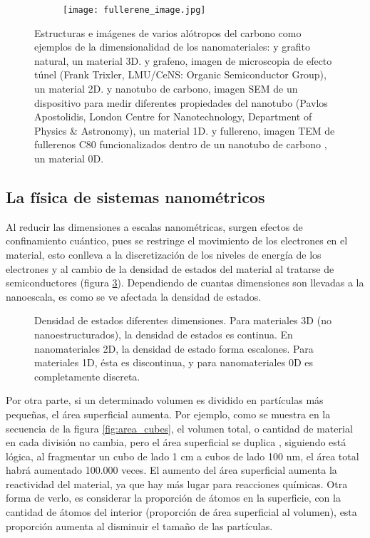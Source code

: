 \begin{figure}
\begin{subfigure}[b]{0.2\textwidth}
		\texttt{[image: fullerene\_image.jpg]}
		\caption{}
		\label{fig:fullerene_image}
	\end{subfigure}
	\caption[Alótropos del carbono mostrando las diferentes dimensionalidades de los nanomateriales]{Estructuras e imágenes de varios alótropos del carbono como ejemplos de la dimensionalidad de los nanomateriales:   y  grafito natural, un material 3D.  y  grafeno, imagen de microscopia de efecto túnel (Frank Trixler, LMU/CeNS: Organic Semiconductor Group), un material 2D.  y  nanotubo de carbono, imagen SEM de un dispositivo para medir diferentes propiedades del nanotubo (Pavlos Apostolidis, London Centre for Nanotechnology, Department of Physics \& Astronomy), un material 1D.  y  fullereno, imagen TEM de fullerenos C80 funcionalizados dentro de un nanotubo de carbono \citep{Gimenez2011}, un material 0D.}
	\label{fig:carbon_allotropes}
\end{figure}

\subsection{La física de sistemas nanométricos}
Al reducir las dimensiones a escalas nanométricas, surgen efectos de confinamiento cuántico, pues se restringe el movimiento de los electrones en el material, esto conlleva a la discretización de los niveles de energía de los electrones y al cambio de la densidad de estados del material al tratarse de semiconductores (figura \ref{fig:DoE}). Dependiendo de cuantas dimensiones son llevadas a la nanoescala, es como se ve afectada la densidad de estados.

\begin{figure}[h!]
	\centering
	\caption[Densidad de estados en diferentes dimensionalidades]{Densidad de estados diferentes dimensiones. Para materiales 3D (no nanoestructurados), la densidad de estados es continua. En nanomateriales 2D, la densidad de estado forma escalones. Para materiales 1D, ésta es discontinua, y para nanomateriales 0D es completamente discreta. }
	\label{fig:DoE}
\end{figure}

Por otra parte, si un determinado volumen es dividido en partículas más pequeñas, el área superficial aumenta. Por ejemplo, como se muestra en la secuencia de la figura \ref{fig:area_cubes}, el volumen total, o cantidad de material en cada división no cambia, pero el área superficial se duplica \footnotemark, siguiendo está lógica, al fragmentar un cubo de lado 1 cm a cubos de lado 100 nm, el área total habrá aumentado 100.000 veces. El aumento del área superficial aumenta la reactividad del material, ya que hay más lugar para reacciones químicas. Otra forma de verlo, es considerar la proporción de átomos en la superficie, con la cantidad de átomos del interior (proporción de área superficial al volumen), esta proporción aumenta al disminuir el tamaño de las partículas.

